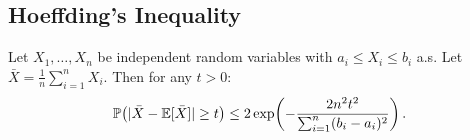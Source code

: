 \documentclass[11pt,a4paper]{article}
\begin{document}
\subsection{Hoeffding's Inequality}
\label{subsec:hoeffding_ineq}

\begin{keyresult}[title={Hoeffding's Inequality}]
\begin{theorem}
\label{thm:hoeffding}
Let $X_1, \ldots, X_n$ be independent random variables with
$a_i \leq X_i \leq b_i$ a.s.  Let
$\bar{X} = \frac{1}{n}\sum_{i=1}^n X_i$.  Then for any
$t > 0$:
\begin{equation}
  \mathbb{P}\!\left(|\bar{X} - \mathbb{E}[\bar{X}]| \geq t\right)
  \leq 2\exp\!\left(
    -\frac{2n^2 t^2}{\sum_{i=1}^n (b_i - a_i)^2}\right).
  \label{eq:hoeffding}
\end{equation}
\end{theorem}
\end{keyresult}
\end{document}
